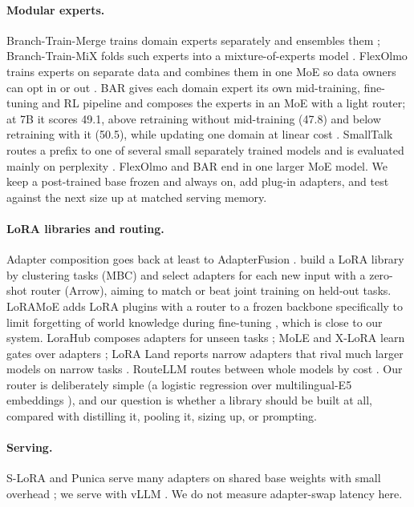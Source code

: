 \documentclass[11pt]{article}
\begin{document}
\paragraph{Modular experts.} Branch-Train-Merge trains domain experts separately and ensembles them
\citep{li2022btm}; Branch-Train-MiX folds such experts into a mixture-of-experts model \citep{sukhbaatar2024btx}.
FlexOlmo trains experts on separate data and combines them in one MoE so data owners can opt in or out
\citep{shi2025flexolmo}. BAR gives each domain expert its own mid-training, fine-tuning and RL pipeline and composes
the experts in an MoE with a light router; at 7B it scores 49.1, above retraining without mid-training (47.8) and
below retraining with it (50.5), while updating one domain at linear cost \citep{morrison2026bar}. SmallTalk routes a
prefix to one of several small separately trained models and is evaluated mainly on perplexity
\citep{filippova2024smalltalk}. FlexOlmo and BAR end in one larger MoE model. We keep a post-trained base frozen and
always on, add plug-in adapters, and test against the next size up at matched serving memory.

\paragraph{LoRA libraries and routing.} Adapter composition goes back at least to AdapterFusion
\citep{pfeiffer2021adapterfusion}. \citet{ostapenko2024arrow} build a LoRA library by clustering tasks (MBC) and
select adapters for each new input with a zero-shot router (Arrow), aiming to match or beat joint training on
held-out tasks. LoRAMoE adds LoRA plugins with a router to a frozen backbone specifically to limit forgetting of world
knowledge during fine-tuning \citep{dou2023loramoe}, which is close to our system. LoraHub composes
adapters for unseen tasks \citep{huang2024lorahub}; MoLE and X-LoRA learn gates over adapters
\citep{wu2024mole,buehler2024xlora}; LoRA Land reports narrow adapters that rival much larger models on narrow tasks
\citep{zhao2024loraland}. RouteLLM routes between whole models by cost \citep{ong2024routellm}. Our router is
deliberately simple (a logistic regression over multilingual-E5 embeddings \citep{wang2024me5}), and our question is
whether a library should be built at all, compared with distilling it, pooling it, sizing up, or prompting.

\paragraph{Serving.} S-LoRA and Punica serve many adapters on shared base weights with small overhead
\citep{sheng2023slora,chen2023punica}; we serve with vLLM \citep{kwon2023vllm}. We do not measure adapter-swap
latency here.
\end{document}
